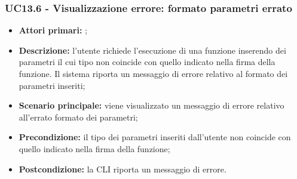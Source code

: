 \subsubsection{UC13.6 - Visualizzazione errore: formato parametri errato}
\begin{itemize}
	\item \textbf{Attori primari:} \ua{};
	\item \textbf{Descrizione:} l’utente richiede l’esecuzione di una funzione inserendo dei parametri il cui tipo non coincide con quello indicato nella firma della funzione. Il sistema riporta un messaggio di errore relativo al formato dei parametri inseriti;
	\item \textbf{Scenario principale:} viene visualizzato un messaggio di errore relativo all'errato formato dei parametri;
	\item \textbf{Precondizione:} il  tipo dei parametri inseriti dall'utente non coincide con quello indicato nella firma della funzione; 
	\item \textbf{Postcondizione:} la CLI riporta un messaggio di errore.
\end{itemize}